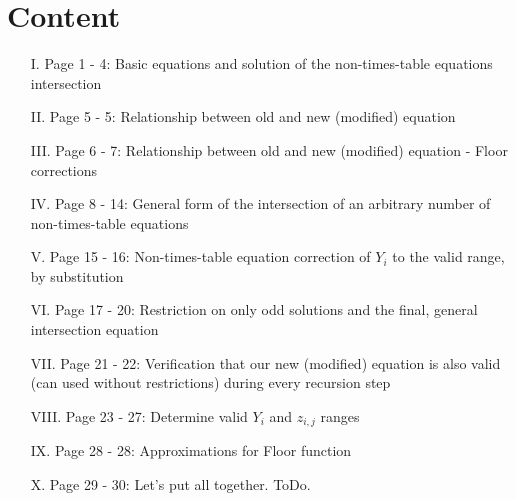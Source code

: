 \section*{Content}
\label{s:content}
\begin{enumerate}
	\item [I.] Page 1 - 4: Basic equations and solution of the non-times-table equations intersection
	\item [II.] Page 5 - 5: Relationship between old and new (modified) equation
	\item [III.] Page 6 - 7: Relationship between old and new (modified) equation - Floor corrections
	\item [IV.] Page 8 - 14: General form of the intersection of an arbitrary number of non-times-table equations
	\item [V.] Page 15 - 16: Non-times-table equation correction of $Y_{i}$ to the valid range, by substitution 
	\item [VI.] Page 17 - 20: Restriction on only odd solutions and the final, general intersection equation
	\item [VII.] Page 21 - 22: Verification that our new (modified) equation is also valid (can used without restrictions) during every recursion step
	\item [VIII.] Page 23 - 27: Determine valid $Y_{i}$ and $z_{i,j}$ ranges
	\item [IX.] Page 28 - 28: Approximations for Floor function
	\item [X.] Page 29 - 30: Let's put all together. ToDo.
\end{enumerate}

